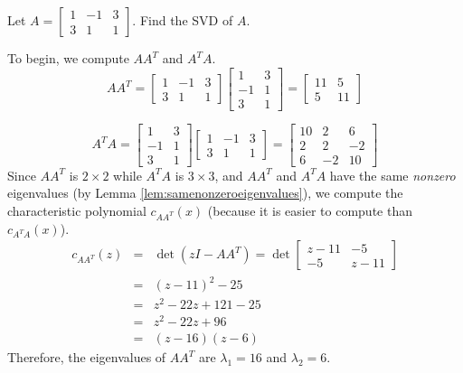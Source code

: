 \documentclass{ximera}
\begin{document}
\begin{example}\label{ex:SVD2x3}
Let
$A=\left[\begin{array}{rrr} 1 & -1 & 3 \\ 3 & 1 & 1 \end{array}\right]$.
Find the SVD of $A$.

\begin{explanation}
To begin, we compute $AA^T$ and $A^TA$.
\[ AA^T = \left[\begin{array}{rrr} 1 & -1 & 3 \\ 3 & 1 & 1 \end{array}\right]
\left[\begin{array}{rr} 1 & 3 \\ -1 & 1 \\ 3 & 1  \end{array}\right]
= \left[\begin{array}{rr} 11 & 5 \\ 5 & 11  \end{array}\right]\]

\[ A^TA = \left[\begin{array}{rr} 1 & 3 \\ -1 & 1 \\ 3 & 1  \end{array}\right]
\left[\begin{array}{rrr} 1 & -1 & 3 \\ 3 & 1 & 1 \end{array}\right]
= \left[\begin{array}{rrr} 10 & 2 & 6 \\ 2 & 2 & -2\\
6 & -2 & 10 \end{array}\right]\]
Since $AA^T$ is $2\times 2$ while $A^T A$ is $3\times 3$, and $AA^T$
and $A^TA$ have the same {\em nonzero} eigenvalues (by Lemma
\ref{lem:samenonzeroeigenvalues}), we compute the characteristic polynomial  $c_{AA^T}(x)$ (because it is
easier to compute than $c_{A^TA}(x)$).
\begin{eqnarray*}
c_{AA^T}(z)& = &\det(zI-AA^T)=  \det \left[\begin{array}{cc}
z-11 & -5 \\ -5 & z-11 \end{array}\right]\\
& = &(z-11)^2 - 25 \\
& = & z^2-22z+121-25\\
& = & z^2-22z+96\\
& = & (z-16)(z-6)
\end{eqnarray*}
Therefore, the eigenvalues of $AA^T$ are $\lambda_1=16$ and $\lambda_2=6$.


\end{explanation}
\end{example}
\end{document}
